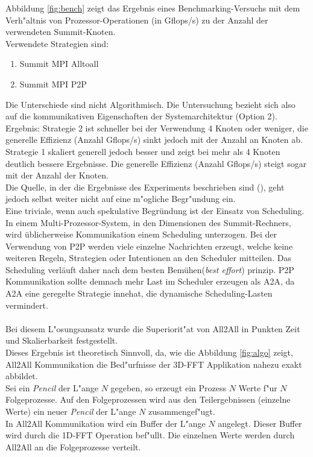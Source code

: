 Abbildung \ref{fig:bench} zeigt das Ergebnis eines Benchmarking-Versuchs mit dem Verh"altnis von Prozessor-Operationen (in Gflops/s) zu der Anzahl der verwendeten Summit-Knoten.\\
Verwendete Strategien sind:
\begin{enumerate}
	\item Summit MPI Alltoall
	\item Summit MPI P2P
\end{enumerate}
Die Unterschiede sind nicht Algorithmisch. Die Untersuchung bezieht sich also auf die kommunikativen Eigenschaften der Systemarchitektur (Option 2).\\
Ergebnis: Strategie 2 ist schneller bei der Verwendung 4 Knoten oder weniger, die generelle Effizienz (Anzahl Gflops/s) sinkt jedoch mit der Anzahl an Knoten ab.\\
Strategie 1 skaliert generell jedoch besser und zeigt bei mehr als 4 Knoten deutlich bessere Ergebnisse. Die generelle Effizienz (Anzahl Gflops/s) steigt sogar mit der Anzahl der Knoten.\\
Die Quelle, in der die Ergebnisse des Experiments beschrieben sind (\cite{mainpaper}), geht jedoch selbst weiter nicht auf eine m"ogliche Begr"undung ein.\\
Eine triviale, wenn auch spekulative Begründung ist der Einsatz von Scheduling. In einem Multi-Prozessor-System, in den Dimensionen des Summit-Rechners, wird üblicherweise Kommunikation einem Scheduling unterzogen. Bei der Verwendung von P2P werden viele einzelne Nachrichten erzeugt, welche keine weiteren Regeln, Strategien oder Intentionen an den Scheduler mitteilen. Das Scheduling verläuft daher nach dem \glqq besten Bemühen\grqq(\textit{best effort}) prinzip. P2P Kommunikation sollte demnach mehr Last im Scheduler erzeugen als A2A, da A2A eine geregelte Strategie innehat, die dynamische Scheduling-Lasten vermindert.\\
\\
Bei diesem L"osungsansatz wurde die Superiorit"at von All2All in Punkten Zeit und Skalierbarkeit festgestellt.\\
Dieses Ergebnis ist theoretisch Sinnvoll, da, wie die Abbildung \ref{fig:algo} zeigt, All2All Kommunikation die Bed"urfnisse der 3D-FFT Applikation nahezu exakt abbildet.\\
Sei ein \textit{Pencil} der L"ange $N$ gegeben, so erzeugt ein Prozess $N$ Werte f"ur $N$ Folgeprozesse. Auf den Folgeprozessen wird aus den Teilergebnissen (einzelne Werte) ein neuer \textit{Pencil} der L"ange $N$ zusammengef"ugt.\\
In All2All Kommunikation wird ein Buffer der L"ange $N$ angelegt. Dieser Buffer wird durch die 1D-FFT Operation bef"ullt. Die einzelnen Werte werden durch All2All an die Folgeprozesse verteilt.

